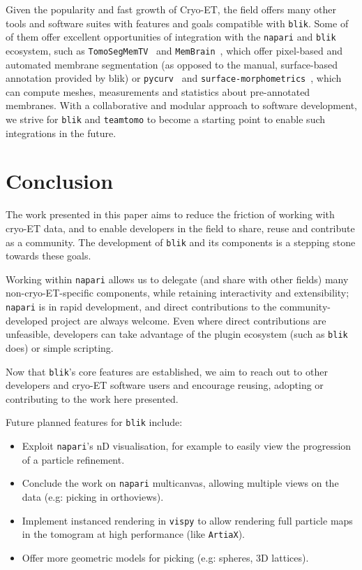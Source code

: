 \vspace{\baselineskip}

Given the popularity and fast growth of Cryo-ET, the field offers many other tools and software suites with features and goals compatible with \texttt{blik}. Some of of them offer excellent opportunities of integration with the \texttt{napari} and \texttt{blik} ecosystem, such as \texttt{TomoSegMemTV}~\cite{martinez-sanchezRobustMembraneDetection2014} and \texttt{MemBrain}~\cite{lammMemBrainDeepLearningaided2022,lammMemBrainV2Endtoend2024}, which offer pixel-based and automated membrane segmentation (as opposed to the manual, surface-based annotation provided by blik) or \texttt{pycurv}~\cite{salferReliableEstimationMembrane2020} and \texttt{surface-morphometrics}~\cite{baradQuantifyingOrganellarUltrastructure2023}, which can compute meshes, measurements and statistics about pre-annotated membranes. With a collaborative and modular approach to software development, we strive for \texttt{blik} and \texttt{teamtomo} to become a starting point to enable such integrations in the future.

\section{Conclusion}

The work presented in this paper aims to reduce the friction of working with cryo-ET data, and to enable developers in the field to share, reuse and contribute as a community. The development of \texttt{blik} and its components is a stepping stone towards these goals.

Working within \texttt{napari} allows us to delegate (and share with other fields) many non-cryo-ET-specific components, while retaining interactivity and extensibility; \texttt{napari} is in rapid development, and direct contributions to the community-developed project are always welcome. Even where direct contributions are unfeasible, developers can take advantage of the plugin ecosystem (such as \texttt{blik} does) or simple scripting.

Now that \texttt{blik}'s core features are established, we aim to reach out to other developers and cryo-ET software users and encourage reusing, adopting or contributing to the work here presented.

Future planned features for \texttt{blik} include:

\begin{itemize}[noitemsep] 
    \item Exploit \texttt{napari}'s nD visualisation, for example to easily view the progression of a particle refinement.
    \item Conclude the work on \texttt{napari} multicanvas, allowing multiple views on the data (e.g: picking in orthoviews).
    \item Implement instanced rendering in \texttt{vispy} to allow rendering full particle maps in the tomogram at high performance (like \texttt{ArtiaX}).
    \item Offer more geometric models for picking (e.g: spheres, 3D lattices).
\end{itemize}

